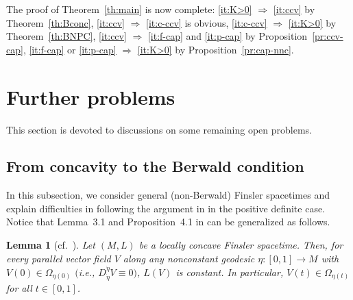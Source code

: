 \documentclass[a4paper,11pt]{article}
\numberwithin{equation}{section}
\theoremstyle{definition}
\theoremstyle{plain}
\newtheorem{lemma}[definition]{Lemma}
\newcommand{\lra}{\longrightarrow}
\begin{document}
The proof of Theorem~\ref{th:main} is now complete:
\eqref{it:K>0} $\Rightarrow$ \eqref{it:ccv} by Theorem~\ref{th:Bconc},
\eqref{it:ccv} $\Rightarrow$ \eqref{it:c-ccv} is obvious,
\eqref{it:c-ccv} $\Rightarrow$ \eqref{it:K>0} by Theorem~\ref{th:BNPC},
\eqref{it:ccv} $\Rightarrow$ \eqref{it:f-cap} and \eqref{it:p-cap} by Proposition~\ref{pr:ccv-cap},
\eqref{it:f-cap} or \eqref{it:p-cap} $\Rightarrow$ \eqref{it:K>0} by Proposition~\ref{pr:cap-nnc}.

\section{Further problems}\label{sc:problem}%

This section is devoted to discussions on some remaining open problems.

\subsection{From concavity to the Berwald condition}\label{ssc:nonB}%

In this subsection, we consider general (non-Berwald) Finsler spacetimes and explain difficulties in following the argument in \cite{IL} in the positive definite case.
Notice that Lemma~3.1 and Proposition~4.1 in \cite{IL} can be generalized as follows.

\begin{lemma}[{cf.\ \cite[Lemma 3.1]{IL}}]
\label{lm:IL3.1}
Let $(M,L)$ be a locally concave Finsler spacetime.
Then, for every parallel vector field $V$ along any nonconstant geodesic $\eta\colon [0,1] \lra M$ with $V(0) \in \Omega_{\eta(0)}$ $($i.e., $D^{\dot{\eta}}_{\dot{\eta}}V \equiv 0)$, $L(V)$ is constant.
In particular, $V(t) \in \Omega_{\eta(t)}$ for all $t \in [0,1]$.
\end{lemma}
\end{document}
